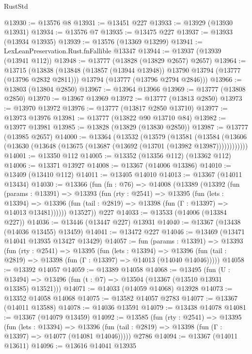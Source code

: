 \begin{lexlean}{RustStd}
\begin{coremodule}
@13930 := @13576 @8
@13931 := @13451 @227
@13933 := @13929 (@13930 @13931)
@13934 := @13576 @7
@13935 := @13475 @227
@13937 := @13933 (@13934 @13935)
@13939 := @13576 (@13369 @13299)
@13941 := LexLeanPreservation.Rust.fnFallible @13347
@13944 := @13937 (@13939 (@13941 @112))
@13948 := @13777 (@13828 (@13829 @2657) @2657)
@13964 := @13715
    (@13838
      (@13848 (@13857 (@13944 @13948)) @13790 @13794 (@13777 (@13796 @2832 @2811)))
      @13794
      (@13777 (@13796 @2794 @2846)))
@13966 := @13803 (@13804 @2850)
@13967 := @13964 @13966
@13969 := @13777 (@13808 @2850)
@13970 := @13967 @13969
@13972 := @13777 (@13813 @2850)
@13973 := @13970 @13972
@13976 := @13777 (@13817 @2850 @13710)
@13977 := @13973 @13976
@13981 := @13777 (@13822 @90 @13710 @84)
@13982 := @13977 @13981
@13985 := @13828 (@13829 (@13830 @2850))
@13987 := @13777 (@13985 @2657)
@14000 := @13364
    (@13532
      (@13579
        (@13581
          (@13584 (@13606 (@13630 (@13648 (@13675 (@13687 (@13692 (@13701 (@13982 @13987))))))))))))
@14001 := @13350 @112
@14005 := @13352 (@13356 @112) (@13362 @112)
@14006 := @13371 @13927
@14008 := @13367 (@14006 @13386)
@14010 := @13409 (@13410 @112)
@14011 := @13405 @14010
@14013 := @13367 (@14011 @13434)
@14030 := @13366
    (fun (fn : @76) =>
    @14008
      (@13389
        (@13392
          (fun (params : @13391) =>
          @13393
            (fun (rty : @2541) =>
            @13395
              (fun (lets : @13394) =>
              @13396 (fun (tail : @2819) => @13398 (fun (Γ : @13397) => @14013 @13481))))))
        @13527))
    @227
@14033 := @13533 (@14006 (@13384 @227))
@14036 := @13446 (@13447 @227) @13931
@14040 := @13367 (@13438 (@14036 @13455) @13459)
@14041 := @13472 @227
@14046 := @13469 (@13471 @14041 @13935 @13427 @13429)
@14057 := fun (params : @13391) =>
  @13393
    (fun (rty : @2541) =>
    @13395
      (fun (lets : @13394) =>
      @13396 (fun (tail : @2819) => @13398 (fun (Γ : @13397) => @14013 (@14040 @14046)))))
@14058 := @13392 @14057
@14059 := @13389 @14058
@14068 := @13495
    (fun (U : @13494) => @13496 (fun (t : @7) => @13504 (@13367 (@13510 @13931 @13385) @13521)))
@14071 := @14033 (@14059 @14068) @13928
@14073 := @13352 @14058 @14068
@14075 := @13582 @14057 @2783
@14077 := @13367 (@14011 @13588)
@14078 := @14036 @13591
@14079 := @13438 @14078
@14081 := @13367 (@14079 @13459)
@14092 := @13585
    (fun (rty : @2541) =>
    @13395
      (fun (lets : @13394) =>
      @13396 (fun (tail : @2819) => @13398 (fun (Γ : @13397) => @14077 (@14081 @14046)))))
    @2786
@14094 := @13367 (@14011 @13611)
@14096 := @13616 @14041 @13935

\end{coremodule}
\end{lexlean}
